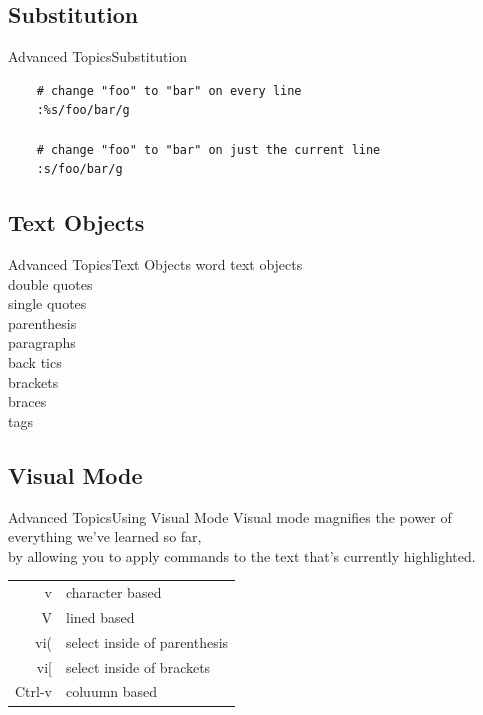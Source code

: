 \documentclass{beamer}
\begin{document}
\subsection{Substitution}
\begin{frame}[fragile]{Advanced Topics}{Substitution}
    \begin{lstlisting}
    # change "foo" to "bar" on every line
    :%s/foo/bar/g

    # change "foo" to "bar" on just the current line
    :s/foo/bar/g
    \end{lstlisting}
\end{frame}


\subsection{Text Objects}
\begin{frame}[c]{Advanced Topics}{Text Objects}
    \centering
    word text objects \\
    double quotes \\
    single quotes \\
    parenthesis \\
    paragraphs \\
    back tics \\
    brackets \\
    braces \\
    tags \\
\end{frame}



\subsection{Visual Mode}
\begin{frame}[t]{Advanced Topics}{Using Visual Mode}
    Visual mode magnifies the power of everything we've learned so far, \\
    by allowing you to apply commands to the text that's currently highlighted.

    \begin{table}[htpb]
        \centering
        \begin{tabular}{r|l}
            v      & character based \\
            V      & lined based \\
            vi(    & select inside of parenthesis \\
            vi[    & select inside of brackets \\
            Ctrl-v & coluumn based \\
        \end{tabular}
    \end{table}
\end{frame}
\end{document}
